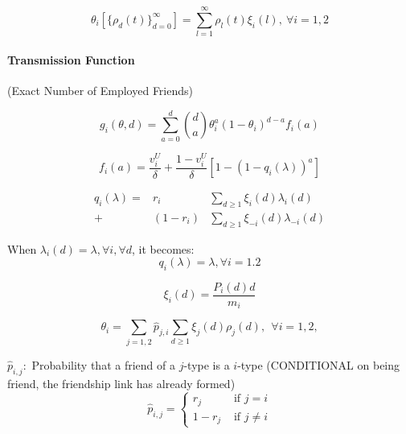 \documentclass[12pt]{article}
\begin{document}
\begin{equation}
 \theta_i [\{\rho_d(t)\}_{d=0}^\infty] = \sum_{l=1}^{\infty} \rho_l(t) \xi_i(l), \  \forall i=1,2
\end{equation}

\paragraph{Transmission Function} (Exact Number of Employed Friends)

\begin{equation}
g_i(\theta, d)=  \sum_{a=0}^{d} \binom{d}{a} \theta_i^a (1-\theta_i)^{d-a} f_i(a)
\end{equation}

\begin{equation}
f_i(a)= \frac{v_i^U}{\delta} +\frac{1-v_i^U}{\delta} \left[1-(1-q_i(\lambda))^a \right]   
\end{equation}



\begin{equation*}
\begin{array}{rcl}
q_i(\lambda) = & r_i & \sum_{d \geq 1}  \xi_i(d)  \lambda_i(d) \\
+ & (1-r_i) & \sum_{d \geq 1}  \xi_{-i}(d)  \lambda_{-i}(d)
\end{array}
\end{equation*}

When $\lambda_i(d)=\lambda, \forall i, \forall d$, it becomes:
\begin{equation*}
q_i(\lambda)=\lambda, \forall i=1.2
\end{equation*}

\begin{equation*}
\xi_i(d)=\frac{P_i(d)d}{m_i}
\end{equation*}

\begin{equation*} 
\theta_i=\sum_{j=1,2} \hat{p}_{j,i} \sum_{d \geq 1} \xi_j(d)\rho_j(d), \ \ \forall i=1,2, 
\end{equation*}



$\hat{p}_{i,j}:$ Probability that a friend of a $j$-type is a $i$-type (CONDITIONAL on being friend, the friendship link has already formed)
\begin{equation*} \hat{p}_{i,j}= \left\{ \begin{array}{ll}
r_j & \text{ if }j=i \\
1-r_j & \text{ if }j \neq i
\end{array} \right.
\end{equation*}
\end{document}
